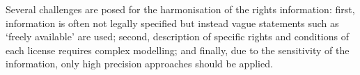 \documentclass[11pt]{article}
\begin{document}

Several challenges are posed for the harmonisation of the rights information: first,
information is often not legally specified but instead vague
statements such as `freely available' are used; second, description
of specific rights and conditions of each license requires complex modelling; 
and finally, due to the sensitivity of the information, only high precision
approaches should be applied.
\end{document}

